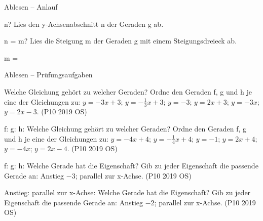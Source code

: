 \begin{aufgabe}{Ablesen – Anlauf}
\begin{teile}
\teil n? Lies den y-Achsenabschnitt n der Geraden g ab.

\begin{ksys}[xmin=-5,xmax=5,ymin=-5,ymax=5,ablesen]  \end{ksys}
n = \leerfeld
\teil m? Lies die Steigung m der Geraden g mit einem Steigungsdreieck ab.

\begin{ksys}[xmin=-5,xmax=5,ymin=-5,ymax=5,ablesen]  \end{ksys}
m = \leerfeld
\end{teile}
\end{aufgabe}

\begin{aufgabe}{Ablesen – Prüfungsaufgaben}
\begin{teile}
\teil Welche Gleichung gehört zu welcher Geraden? Ordne den Geraden f, g und h je eine der Gleichungen zu: $y = -3x + 3$; $y = -\frac{1}{3}x + 3$; $y = -3$; $y = 2x + 3$; $y = -3x$; $y = 2x - 3$. \hfill (P10 2019 OS) \\

\begin{ksys}[xmin=-5,xmax=5,ymin=-5,ymax=5,ablesen]    \end{ksys}
f: \leerfeld \quad g: \leerfeld \quad h: \leerfeld
\teil Welche Gleichung gehört zu welcher Geraden? Ordne den Geraden f, g und h je eine der Gleichungen zu: $y = -4x + 4$; $y = -\frac{1}{4}x + 4$; $y = -1$; $y = 2x + 4$; $y = -4x$; $y = 2x - 4$. \hfill (P10 2019 OS) \\

\begin{ksys}[xmin=-5,xmax=5,ymin=-5,ymax=5,ablesen]    \end{ksys}
f: \leerfeld \quad g: \leerfeld \quad h: \leerfeld
\teil Welche Gerade hat die Eigenschaft? Gib zu jeder Eigenschaft die passende Gerade an: Anstieg $-3$; parallel zur x-Achse. \hfill (P10 2019 OS) \\

\begin{ksys}[xmin=-5,xmax=5,ymin=-5,ymax=5,ablesen]    \end{ksys}
Anstieg: \leerfeld \quad parallel zur x-Achse: \leerfeld
\teil Welche Gerade hat die Eigenschaft? Gib zu jeder Eigenschaft die passende Gerade an: Anstieg $-2$; parallel zur x-Achse. \hfill (P10 2019 OS) \\


\end{teile}
\end{aufgabe}
